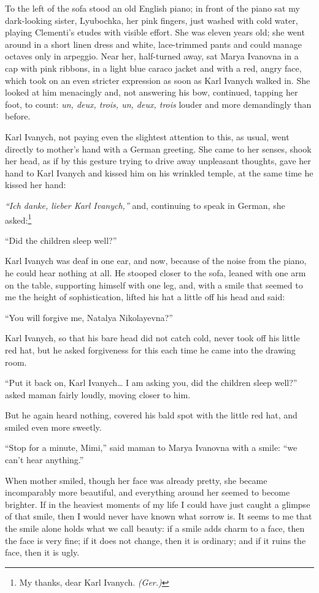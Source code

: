 To the left of the sofa stood an old English piano; in front of the piano sat my dark-looking sister, Lyubochka, her pink fingers, just washed with cold water, playing Clementi's etudes with visible effort. She was eleven years old; she went around in a short linen dress and white, lace-trimmed pants and could manage octaves only in arpeggio. Near her, half-turned away, sat Marya Ivanovna in a cap with pink ribbons, in a light blue caraco jacket and with a red, angry face, which took on an even stricter expression as soon as Karl Ivanych walked in. She looked at him menacingly and, not answering his bow, continued, tapping her foot, to count: \textit{un, deux, trois, un, deux, trois} louder and more demandingly than before.

Karl Ivanych, not paying even the slightest attention to this, as usual, went directly to mother's hand with a German greeting. She came to her senses, shook her head, as if by this gesture trying to drive away unpleasant thoughts, gave her hand to Karl Ivanych and kissed him on his wrinkled temple, at the same time he kissed her hand:

\textit{``Ich danke, lieber Karl Ivanych,''} and, continuing to speak in German, she asked:\footnote{My thanks, dear Karl Ivanych. \textit{(Ger.)}} %

``Did the children sleep well?'' %

Karl Ivanych was deaf in one ear, and now, because of the noise from the piano, he could hear nothing at all. He stooped closer to the sofa, leaned with one arm on the table, supporting himself with one leg, and, with a smile that seemed to me the height of sophistication, lifted his hat a little off his head and said:

``You will forgive me, Natalya Nikolayevna?'' %

Karl Ivanych, so that his bare head did not catch cold, never took off his little red hat, but he asked forgiveness for this each time he came into the drawing room.

``Put it back on, Karl Ivanych\ldots{} I am asking you, did the children sleep well?'' asked maman fairly loudly, moving closer to him. %

But he again heard nothing, covered his bald spot with the little red hat, and smiled even more sweetly.

``Stop for a minute, Mimi,'' said maman to Marya Ivanovna with a smile: ``we can't hear anything.'' %

When mother smiled, though her face was already pretty, she became incomparably more beautiful, and everything around her seemed to become brighter. If in the heaviest moments of my life I could have just caught a glimpse of that smile, then I would never have known what sorrow is. It seems to me that the smile alone holds what we call beauty: if a smile adds charm to a face, then the face is very fine; if it does not change, then it is ordinary; and if it ruins the face, then it is ugly.


